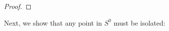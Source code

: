 \documentclass[12pt]{amsart}
\begin{document}
\begin{proof}
% 
%
% 
\end{proof}



Next, we show that any point in $S^0$ must be isolated: 
\end{document}
